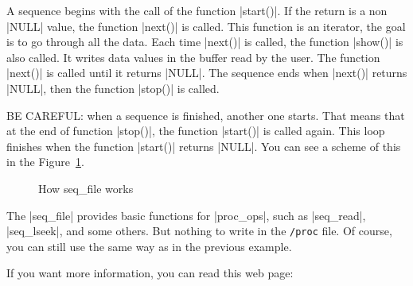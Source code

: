 \documentclass[10pt, oneside]{book}
\begin{document}
A sequence begins with the call of the function \cpp|start()|.
If the return is a non \cpp|NULL| value, the function \cpp|next()| is called.
This function is an iterator, the goal is to go through all the data.
Each time \cpp|next()| is called, the function \cpp|show()| is also called.
It writes data values in the buffer read by the user.
The function \cpp|next()| is called until it returns \cpp|NULL|.
The sequence ends when \cpp|next()| returns \cpp|NULL|, then the function \cpp|stop()| is called.

BE CAREFUL: when a sequence is finished, another one starts.
That means that at the end of function \cpp|stop()|, the function \cpp|start()| is called again.
This loop finishes when the function \cpp|start()| returns \cpp|NULL|.
You can see a scheme of this in the Figure~\ref{img:seqfile}.

\begin{figure}
  \center
  \caption{How seq\_file works}
  \label{img:seqfile}
\end{figure}

The \cpp|seq_file| provides basic functions for \cpp|proc_ops|, such as \cpp|seq_read|, \cpp|seq_lseek|, and some others.
But nothing to write in the \verb|/proc| file.
Of course, you can still use the same way as in the previous example.


If you want more information, you can read this web page:
\end{document}
